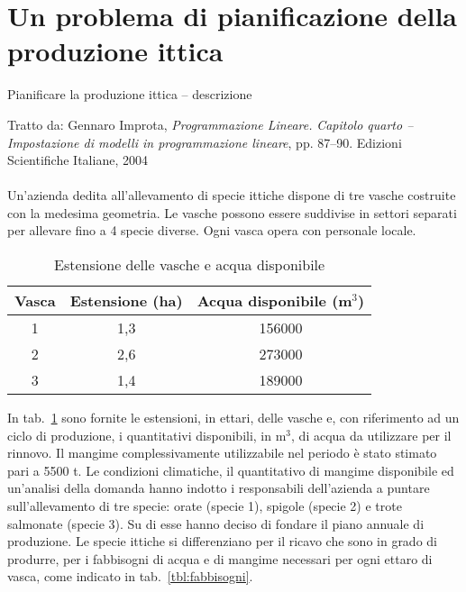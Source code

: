 \documentclass{beamer}
\begin{document}
\generatitolo

\section{Un problema di pianificazione della produzione ittica}

\begin{frame}[allowframebreaks]
{Pianificare la produzione ittica -- descrizione}

Tratto da: Gennaro Improta, \textit{Programmazione Lineare.} \textsl{Capitolo quarto -- Impostazione di modelli in programmazione lineare}, pp. 87--90. Edizioni Scientifiche Italiane, 2004
\\~\\

Un'azienda dedita all'allevamento di specie ittiche dispone di tre vasche costruite con la medesima geometria.
Le vasche possono essere suddivise in settori separati per allevare fino a 4 specie diverse.
Ogni vasca opera con personale locale.

\begin{table}
 \begin{tabular}{ccc}
  \toprule
  \multicolumn{1}{c}{\centering\textbf{Vasca}} &
  \multicolumn{1}{p{2cm}}{\centering\textbf{Estensione (ha)}} &
  \multicolumn{1}{p{2.5cm}}{\centering\textbf{Acqua disponibile (m$^3$)}}\\
  \midrule
  1 & 1,3 & 156000\\
  2 & 2,6 & 273000\\
  3 & 1,4 & 189000\\
  \bottomrule
 \end{tabular}
  \caption{Estensione delle vasche e acqua disponibile}\label{tbl:estensione}
\end{table}

In tab.~\ref{tbl:estensione} sono fornite le estensioni, in ettari, delle vasche e, con riferimento ad un ciclo di produzione,
i quantitativi disponibili, in m$^3$, di acqua da utilizzare per il rinnovo.
Il mangime complessivamente utilizzabile nel periodo \`e stato stimato pari a 5500 t.
Le condizioni climatiche, il quantitativo di mangime disponibile ed un'analisi della domanda hanno indotto i responsabili
dell'azienda a puntare sull'allevamento di tre specie: orate (specie 1), spigole (specie 2) e trote salmonate (specie 3).
Su di esse hanno deciso di fondare il piano annuale di produzione.
Le specie ittiche si differenziano per il ricavo che sono in grado di produrre, per i fabbisogni di acqua e di mangime
necessari per ogni ettaro di vasca, come indicato in tab.~\ref{tbl:fabbisogni}.



\end{frame}
\end{document}

